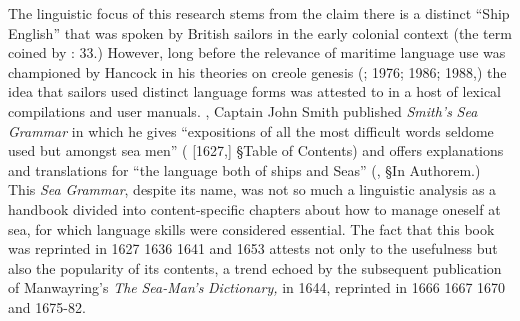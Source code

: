 The linguistic focus of this research stems from the claim there is a distinct “Ship English” that was spoken by British sailors in the early colonial context (the term coined by \citealt{Hancock1976}: 33.) However, long before the relevance of maritime language use was championed by Hancock in his theories on creole genesis (\citealt{Hancock1972}; 1976; 1986; 1988,) the idea that sailors used distinct language forms was attested to in a host of lexical compilations and user manuals. \citealt{In1627}, Captain John Smith published \textit{Smith’s} \textit{Sea} \textit{Grammar} in which he gives “expositions of all the most difficult words seldome used but amongst sea men” (\citealt{Smith1968} [1627,] §Table of Contents) and offers explanations and translations for “the language both of ships and Seas” (\citealt{Smith1968}, §In Authorem.) This \textit{Sea} \textit{Grammar}, despite its name, was not so much a linguistic analysis as a handbook divided into content-specific chapters about how to manage oneself at sea, for which language skills were considered essential. The fact that this book was reprinted in 1627 1636 1641 and 1653 attests not only to the usefulness but also the popularity of its contents, a trend echoed by the subsequent publication of Manwayring’s \textit{The} \textit{Sea-Man’s} \textit{Dictionary,} in 1644, reprinted in 1666 1667 1670 and 1675-82. 



